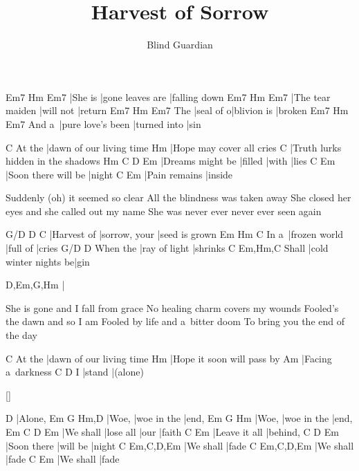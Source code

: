 \documentclass{song}
\title{Harvest of Sorrow}
\author{Blind Guardian}
\begin{document}
\begin{multicols}{2}

\strophe
Em7     Hm               Em7     
|She is |gone leaves are |falling down
Em7              Hm        Em7
|The tear maiden |will not |return
    Em7       Hm          Em7
The |seal of o|blivion is |broken
      Em7               Hm           Em7
And a~|pure love's been |turned into |sin
\endstrophe

\strophe
       C
At the |dawn of our living time
Hm
|Hope may cover all cries
C
|Truth lurks hidden in the shadows
Hm               C       D     Em
|Dreams might be |filled |with |lies
C                   Em
|Soon there will be |night
C             Em
|Pain remains |inside
\endstrophe

\strophe*
Suddenly (oh) it seemed so clear
All the blindness was taken away
She closed her eyes and she called out my name
She was never ever never ever seen again
\endstrophe

G/D         D             C
|Harvest of |sorrow, your |seed is grown
     Em            Hm       C
In a~|frozen world |full of |cries
         G/D           D
When the |ray of light |shrinks
      C                     Em,Hm,C
Shall |cold winter nights be|gin
\endstrophe

\strophe
D,Em,G,Hm
|
\endstrophe

\columnbreak

\strophe*
She is gone and I fall from grace
No healing charm covers my wounds
Fooled's the dawn and so I am
Fooled by life and a~bitter doom
To bring you the end of the day
\endstrophe

\strophe
       C
At the |dawn of our living time
Hm
|Hope it soon will pass by
Am
|Facing a~darkness
  C      D
I |stand |(alone)
\endstrophe

\ref{}

\strophe
D
|Alone,
Em    G           Hm,D
|Woe, |woe in the |end,
Em    G           Hm
|Woe, |woe in the |end,
Em        C         D    Em
|We shall |lose all |our |faith
C             Em
|Leave it all |behind,
C           D        Em
|Soon there |will be |night
C         Em,C,D,Em
|We shall |fade
C         Em,C,D,Em
|We shall |fade
C         Em
|We shall |fade
\endstrophe

\end{multicols}
\end{document}
